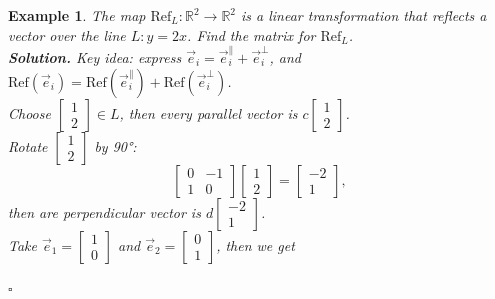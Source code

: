 \documentclass[12pt, a4paper]{article}
\newtheorem{eg}{Example}[subsection]
\newenvironment*{sol}{\indent\textbf{Solution. }}{\hfill{$\square$}\par}
\def\R{{\mathbb{R}}}
\def\vece{\vec{e}}
\begin{document}
\begin{eg}
The map $\text{Ref}_L:\R^2\rightarrow\R^2$ is a linear transformation that reflects a vector over the line $L: y=2x$. Find the matrix for $\text{Ref}_L$.\\
\begin{sol}
Key idea: express $\vece_i=\vece_i^\parallel+\vece_i^\perp$, and $\text{Ref}(\vece_i)=\text{Ref}(\vece_i^\parallel)+\text{Ref}(\vece_i^\perp)$. \\
Choose $\begin{bmatrix}1\\2\end{bmatrix} \in L$, then every parallel vector is $c\begin{bmatrix}1\\2\end{bmatrix}$.\\
Rotate $\begin{bmatrix}1\\2\end{bmatrix}$ by 90°: $$\begin{bmatrix}0&-1\\1&0\end{bmatrix}\begin{bmatrix}1\\2\end{bmatrix}=\begin{bmatrix}-2\\1\end{bmatrix}, $$
then are perpendicular vector is $d\begin{bmatrix}-2\\1\end{bmatrix}$. \\
Take $\vece_1=\begin{bmatrix}1\\0\end{bmatrix}$ and $\vece_2=\begin{bmatrix}0\\1\end{bmatrix}$, then we get

\end{sol}
\end{eg}
\end{document}
